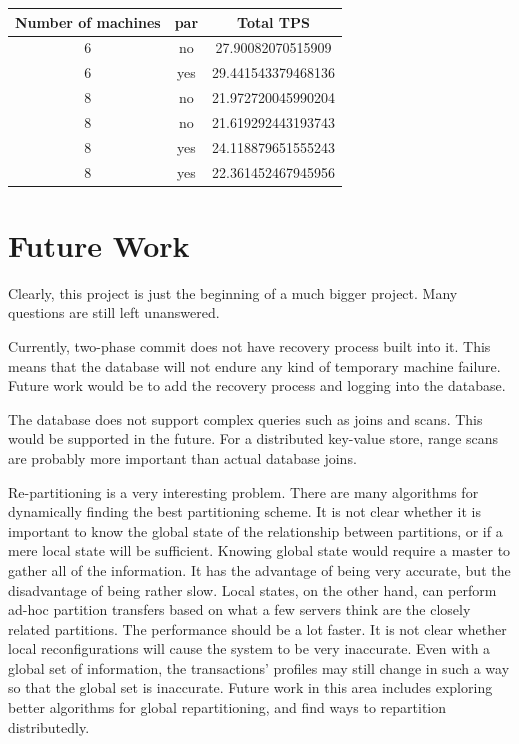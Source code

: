 \documentclass[a4paper, 10pt, notitlepage]{article}
\begin{document}
\begin{tabular}{c c c}
Number of machines & par & Total TPS \\
\hline
6 & no & 27.90082070515909 \\
6 & yes & 29.441543379468136 \\
8 & no &  21.972720045990204 \\
8 & no & 21.619292443193743 \\
8 & yes &  24.118879651555243 \\
8 & yes &  22.361452467945956 \\
\end{tabular}

\section*{Future Work}

Clearly, this project is just the beginning of a much bigger project. Many questions are still left unanswered. 

Currently, two-phase commit does not have recovery process built into it. This means that the database will not
endure any kind of temporary machine failure. Future work would be to add the recovery process and logging into
the database.

The database does not support complex queries such as joins and scans. This would be supported in the future.
For a distributed key-value store, range scans are probably more important than actual database joins.

Re-partitioning is a very interesting problem. There are many algorithms for dynamically finding the best
partitioning scheme. It is not clear whether it is important to know the global state of the relationship
between partitions, or if a mere local state will be sufficient. Knowing global state would require a master
to gather all of the information. It has the advantage of being very accurate, but the disadvantage of being 
rather slow.
Local states, on the other hand, can perform ad-hoc partition transfers based on
what a few servers think are the closely related partitions. The performance should be a lot faster.
It is not clear whether local reconfigurations
will cause the system to be very inaccurate. Even with a global set of information, the transactions' profiles
may still change in such a way so that the global set is inaccurate. Future work in this area includes exploring better
algorithms for global repartitioning, and find ways to repartition distributedly.
\end{document}
